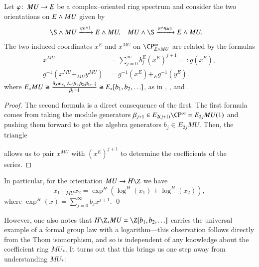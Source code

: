\begin{lemma}\label{OrientationsOnEAndMU}
Let $\varphi\colon\thinspace MU \to E$ be a complex--oriented ring spectrum and consider the two orientations on $E \wedge MU$ given by
\begin{align*}
\S \sm MU & \xrightarrow{\eta_E \sm 1} E \sm MU, &
MU \sm \S & \xrightarrow{\phi \sm \eta_{MU}} E \sm MU.
\end{align*}
The two induced coordinates $x^E$ and $x^{MU}$ on $\CP^\infty_{E \sm MU}$ are related by the formulas
\begin{align*}
x^{MU} & = \sum_{j=0}^\infty b_j^E (x^E)^{j+1} =: g(x^E), \\
g^{-1}(x^{MU} +_{MU} y^{MU}) & = g^{-1}(x^E) +_E g^{-1}(y^E).
\end{align*}
where $E_* MU \cong \frac{\operatorname{Sym}_{E_*} E_*\{\beta_1, \beta_2, \beta_3, \ldots\}}{\beta_1 = 1} \cong E_*[b_1, b_2, \ldots]$, as in , , and .
\end{lemma}
\begin{proof}
The second formula is a direct consequence of the first.  The first formula comes from taking the module generators $\beta_{j+1} \in E_{2(j+1)} \CP^\infty = E_{2j} MU(1)$ and pushing them forward to get the algebra generators $b_j \in E_{2j} MU$.  Then, the triangle
\begin{center}
\end{center}
allows us to pair $x^{MU}$ with $(x^E)^{j+1}$ to determine the coefficients of the series.
\end{proof}

\begin{corollary}\label{HZMUCarriesALog}
In particular, for the orientation $MU \to H\Z$ we have \[x_1 +_{MU} x_2 = \exp^H(\log^H(x_1) + \log^H(x_2)),\] where $\exp^H(x) = \sum_{j=0}^\infty b_j x^{j+1}$. \qed
\end{corollary}

However, one also notes that $H\Z_* MU = \Z[b_1, b_2, \ldots]$ carries the universal example of a formal group law with a logarithm---this observation follows directly from the Thom isomorphism, and so is independent of any knowledge about the coefficient ring $MU_*$.  It turns out that this brings us one step away from understanding $MU_*$:

